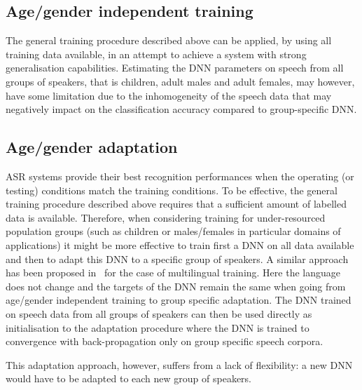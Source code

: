 \documentclass{nle}
\begin{document}
\subsection{Age/gender independent training} 
The general training procedure described above can be applied, by using
all training data available, in an attempt to  achieve   a  system  with   strong  generalisation  capabilities.
Estimating the DNN  parameters on speech from all  groups of speakers,
that is  children, adult  males and adult  females, may however, have
some limitation due to the  inhomogeneity of the speech data that may
negatively   impact  on  the   classification  accuracy   compared  to
group-specific DNN.

\subsection{Age/gender adaptation}
ASR  systems  provide their  best  recognition  performances when  the
operating  (or testing)  conditions match   the training
conditions.  To be effective, the general training procedure described
above requires that a sufficient  amount of labelled data is available.
Therefore,  when considering  training  for under-resourced  population groups
(such  as   children  or   males/females  in  particular   domains  of
applications) it  might be more  effective to train  first a DNN  on all
data available and then to adapt this DNN to a specific group of speakers. 
A similar approach has been proposed in~\citet{thomas13} for  the  case of  multilingual training.
Here the language  does not change and the targets of the DNN remain
the same when going from age/gender independent training to group
  specific adaptation.  The DNN trained on speech data from all groups
  of  speakers can  then be  used  directly as  initialisation to  the
  adaptation  procedure where  the DNN  is trained  to convergence
  with back-propagation only on group specific speech corpora.
  
This adaptation approach, however, suffers from a lack of flexibility: 
a new DNN would have to be adapted to each new group of speakers.
  
\end{document}
